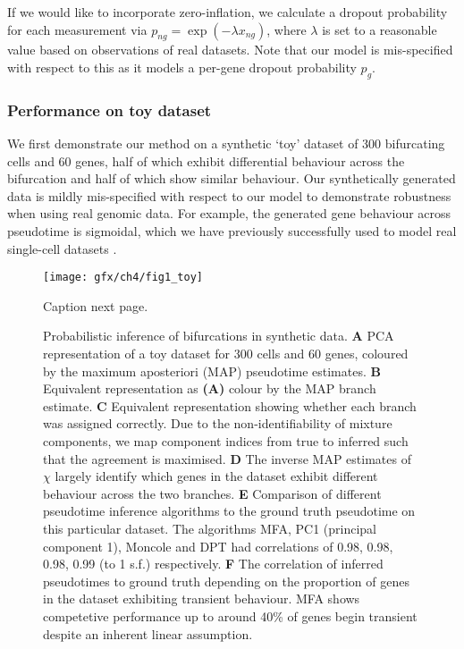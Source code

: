 If we would like to incorporate zero-inflation, we calculate a dropout probability for each measurement via $p_{ng} = \exp(-\lambda x_{ng})$, where $\lambda$ is set to a reasonable value based on observations of real datasets. Note that our model is mis-specified with respect to this as it models a per-gene dropout probability $p_g$.

\subsubsection{Performance on toy dataset}

We first demonstrate our method on a synthetic `toy' dataset of 300 bifurcating cells and 60 genes, half of which exhibit differential behaviour across the bifurcation and half of which show similar behaviour.
Our synthetically generated data is mildly mis-specified with respect to our model to demonstrate robustness when using real genomic data. For example, the generated gene behaviour across pseudotime is sigmoidal, which we have previously successfully used to model real single-cell datasets \cite{campbell2016order,campbell2016switchde}.

\begin{figure}
	\centering
	\texttt{[image: gfx/ch4/fig1\_toy]}
 \caption{Caption next page.}\label{fig:toy}
\end{figure}
\addtocounter{figure}{-1}
\begin{figure}
\caption{Probabilistic inference of bifurcations in synthetic data. 
\textbf{A} PCA representation of a toy dataset for 300 cells and 60 genes, coloured by the maximum aposteriori (MAP) pseudotime estimates.
\textbf{B} Equivalent representation as \textbf{(A)} colour by the MAP branch estimate.
\textbf{C} Equivalent representation showing whether each branch was assigned correctly. Due to the non-identifiability of mixture components, we map component indices from true to inferred such that the agreement is maximised.
\textbf{D} The inverse MAP estimates of $\chi$ largely identify which genes in the dataset exhibit different behaviour across the two branches.
\textbf{E} Comparison of different pseudotime inference algorithms to the ground truth pseudotime on this particular dataset. The algorithms MFA, PC1 (principal component 1), Moncole and DPT had correlations of 0.98, 0.98, 0.98, 0.99 (to 1 s.f.) respectively.
\textbf{F} The correlation of inferred pseudotimes to ground truth depending on the proportion of genes in the dataset exhibiting transient behaviour. MFA shows competetive performance up to around 40\% of genes begin transient despite an inherent linear assumption.}
\end{figure}

